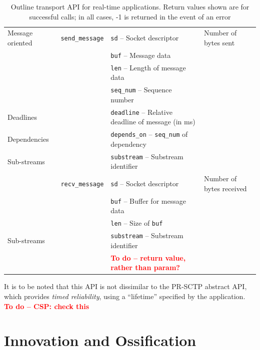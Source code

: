 \documentclass{sig-alternate-05-2015}
\newcommand{\todo}[1]{\textbf{\textcolor{red}{To do -- #1}}}
\begin{document}
\begin{table}
\begin{tabularx}{\textwidth}{llll}
    \midrule
      Message oriented             & \texttt{send\_message}  
                                              & \texttt{sd} -- Socket descriptor               & Number of bytes sent \\
                                   &          & \texttt{buf} -- Message data & \\
                                   &          & \texttt{len} -- Length of message data & \\
                                   &          & \texttt{seq\_num} -- Sequence number & \\
      Deadlines                    &          & \texttt{deadline} -- Relative deadline of message (in ms) & \\ 
      Dependencies                 &          & \texttt{depends\_on} -- \texttt{seq\_num} of dependency & \\
      Sub-streams                  &          & \texttt{substream} -- Substream identifier & \\
                                   & \texttt{recv\_message}  
                                              & \texttt{sd} -- Socket descriptor               & Number of bytes received \\
                                   &          & \texttt{buf} -- Buffer for message data & \\
                                   &          & \texttt{len} -- Size of \texttt{buf} & \\
      Sub-streams                  &          & \texttt{substream} -- Substream identifier & \\
                                   &          & \todo{return value, rather than param?} & \\
    \bottomrule
  \end{tabularx}
  \caption{Outline transport API for real-time applications. Return values
  shown are for successful calls; in all cases, -1 is returned in the event
  of an error}
  \label{tab:api}
\end{table}

It is to be noted that this API is not dissimilar to the PR-SCTP abstract
API, which provides \textit{timed reliability}, using a ``lifetime''
specified by the application. \todo{CSP: check this}

\section{Innovation and Ossification}
\label{sec:ossification}
\end{document}
